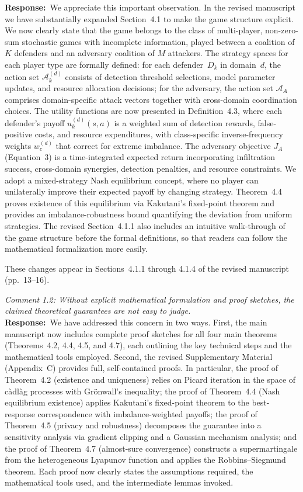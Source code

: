 \documentclass[12pt,a4paper]{article}
\newcommand{\RC}[1]{\noindent\textit{#1}\vspace{0.3em}\\}
\newcommand{\AR}{\noindent\textbf{Response:}~}
\begin{document}
\AR We appreciate this important observation. In the revised manuscript we have substantially expanded Section~4.1 to make the game structure explicit. We now clearly state that the game belongs to the class of multi-player, non-zero-sum stochastic games with incomplete information, played between a coalition of $K$ defenders and an adversary coalition of $M$ attackers. The strategy spaces for each player type are formally defined: for each defender~$D_k$ in domain~$d$, the action set $\mathcal{A}_k^{(d)}$ consists of detection threshold selections, model parameter updates, and resource allocation decisions; for the adversary, the action set $\mathcal{A}_A$ comprises domain-specific attack vectors together with cross-domain coordination choices. The utility functions are now presented in Definition~4.3, where each defender's payoff $u_k^{(d)}(s,a)$ is a weighted sum of detection rewards, false-positive costs, and resource expenditures, with class-specific inverse-frequency weights $w_c^{(d)}$ that correct for extreme imbalance. The adversary objective $J_A$ (Equation~3) is a time-integrated expected return incorporating infiltration success, cross-domain synergies, detection penalties, and resource constraints. We adopt a mixed-strategy Nash equilibrium concept, where no player can unilaterally improve their expected payoff by changing strategy. Theorem~4.4 proves existence of this equilibrium via Kakutani's fixed-point theorem and provides an imbalance-robustness bound quantifying the deviation from uniform strategies. The revised Section~4.1.1 also includes an intuitive walk-through of the game structure before the formal definitions, so that readers can follow the mathematical formalization more easily.

These changes appear in Sections~4.1.1 through 4.1.4 of the revised manuscript (pp.~13--16).

\vspace{0.8em}

\RC{Comment 1.2: Without explicit mathematical formulation and proof sketches, the claimed theoretical guarantees are not easy to judge.}

\AR We have addressed this concern in two ways. First, the main manuscript now includes complete proof sketches for all four main theorems (Theorems~4.2, 4.4, 4.5, and 4.7), each outlining the key technical steps and the mathematical tools employed. Second, the revised Supplementary Material (Appendix~C) provides full, self-contained proofs. In particular, the proof of Theorem~4.2 (existence and uniqueness) relies on Picard iteration in the space of c\`adl\`ag processes with Gr\"onwall's inequality; the proof of Theorem~4.4 (Nash equilibrium existence) applies Kakutani's fixed-point theorem to the best-response correspondence with imbalance-weighted payoffs; the proof of Theorem~4.5 (privacy and robustness) decomposes the guarantee into a sensitivity analysis via gradient clipping and a Gaussian mechanism analysis; and the proof of Theorem~4.7 (almost-sure convergence) constructs a supermartingale from the heterogeneous Lyapunov function and applies the Robbins--Siegmund theorem. Each proof now clearly states the assumptions required, the mathematical tools used, and the intermediate lemmas invoked.
\end{document}
